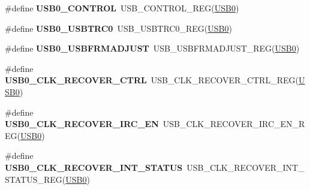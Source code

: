 \begin{DoxyCompactItemize}
\item 
\#define {\bfseries U\+S\+B0\+\_\+\+C\+O\+N\+T\+R\+OL}~U\+S\+B\+\_\+\+C\+O\+N\+T\+R\+O\+L\+\_\+\+R\+EG(\hyperlink{group__USB__Peripheral__Access__Layer_gaea56c015ce8ad0cc88464060fde6d87c}{U\+S\+B0})\hypertarget{group__USB__Register__Accessor__Macros_gaf00c1bd9c15954db30472d3273cf7ec2}{}\label{group__USB__Register__Accessor__Macros_gaf00c1bd9c15954db30472d3273cf7ec2}

\item 
\#define {\bfseries U\+S\+B0\+\_\+\+U\+S\+B\+T\+R\+C0}~U\+S\+B\+\_\+\+U\+S\+B\+T\+R\+C0\+\_\+\+R\+EG(\hyperlink{group__USB__Peripheral__Access__Layer_gaea56c015ce8ad0cc88464060fde6d87c}{U\+S\+B0})\hypertarget{group__USB__Register__Accessor__Macros_ga05ec0dc133dcc7675dda9e96c6ed222b}{}\label{group__USB__Register__Accessor__Macros_ga05ec0dc133dcc7675dda9e96c6ed222b}

\item 
\#define {\bfseries U\+S\+B0\+\_\+\+U\+S\+B\+F\+R\+M\+A\+D\+J\+U\+ST}~U\+S\+B\+\_\+\+U\+S\+B\+F\+R\+M\+A\+D\+J\+U\+S\+T\+\_\+\+R\+EG(\hyperlink{group__USB__Peripheral__Access__Layer_gaea56c015ce8ad0cc88464060fde6d87c}{U\+S\+B0})\hypertarget{group__USB__Register__Accessor__Macros_ga7b5628cccd04a47b3f3bc51d01b7fc2d}{}\label{group__USB__Register__Accessor__Macros_ga7b5628cccd04a47b3f3bc51d01b7fc2d}

\item 
\#define {\bfseries U\+S\+B0\+\_\+\+C\+L\+K\+\_\+\+R\+E\+C\+O\+V\+E\+R\+\_\+\+C\+T\+RL}~U\+S\+B\+\_\+\+C\+L\+K\+\_\+\+R\+E\+C\+O\+V\+E\+R\+\_\+\+C\+T\+R\+L\+\_\+\+R\+EG(\hyperlink{group__USB__Peripheral__Access__Layer_gaea56c015ce8ad0cc88464060fde6d87c}{U\+S\+B0})\hypertarget{group__USB__Register__Accessor__Macros_gaea1bc7a3f1ef0cadb176d3082f741d92}{}\label{group__USB__Register__Accessor__Macros_gaea1bc7a3f1ef0cadb176d3082f741d92}

\item 
\#define {\bfseries U\+S\+B0\+\_\+\+C\+L\+K\+\_\+\+R\+E\+C\+O\+V\+E\+R\+\_\+\+I\+R\+C\+\_\+\+EN}~U\+S\+B\+\_\+\+C\+L\+K\+\_\+\+R\+E\+C\+O\+V\+E\+R\+\_\+\+I\+R\+C\+\_\+\+E\+N\+\_\+\+R\+EG(\hyperlink{group__USB__Peripheral__Access__Layer_gaea56c015ce8ad0cc88464060fde6d87c}{U\+S\+B0})\hypertarget{group__USB__Register__Accessor__Macros_gada45293f27c0f897f143bcb0eca56454}{}\label{group__USB__Register__Accessor__Macros_gada45293f27c0f897f143bcb0eca56454}

\item 
\#define {\bfseries U\+S\+B0\+\_\+\+C\+L\+K\+\_\+\+R\+E\+C\+O\+V\+E\+R\+\_\+\+I\+N\+T\+\_\+\+S\+T\+A\+T\+US}~U\+S\+B\+\_\+\+C\+L\+K\+\_\+\+R\+E\+C\+O\+V\+E\+R\+\_\+\+I\+N\+T\+\_\+\+S\+T\+A\+T\+U\+S\+\_\+\+R\+EG(\hyperlink{group__USB__Peripheral__Access__Layer_gaea56c015ce8ad0cc88464060fde6d87c}{U\+S\+B0})\hypertarget{group__USB__Register__Accessor__Macros_ga94b2c4a350a0b3c9470422f071b35090}{}\label{group__USB__Register__Accessor__Macros_ga94b2c4a350a0b3c9470422f071b35090}


\end{DoxyCompactItemize}
